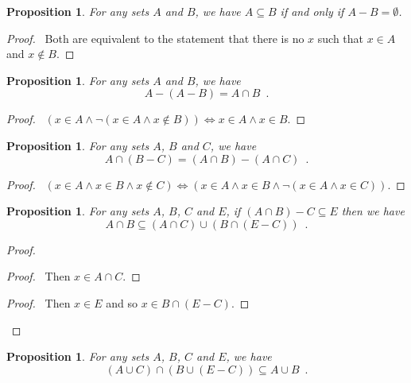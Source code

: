 \documentclass{report}
\let\qed\relax
\newtheorem{prop}[ax]{Proposition}
\theoremstyle{definition}
\begin{document}
\begin{prop}
For any sets $A$ and $B$, we have $A \subseteq B$ if and only if $A - B = \emptyset$.
\end{prop}

\begin{proof}
\pf\ Both are equivalent to the statement that there is no $x$ such that $x \in A$ and $x \notin B$. \qed
\end{proof}

\begin{prop}
For any sets $A$ and $B$, we have
\[ A - (A - B) = A \cap B \enspace . \]
\end{prop}

\begin{proof}
\pf\ $(x \in A \wedge \neg (x \in A \wedge x \notin B)) \Leftrightarrow x \in A \wedge x \in B$. \qed
\end{proof}

\begin{prop}
For any sets $A$, $B$ and $C$, we have
\[ A \cap (B - C) = (A \cap B) - (A \cap C) \enspace . \]
\end{prop}

\begin{proof}
\pf\ $(x \in A \wedge x \in B \wedge x \notin C) \Leftrightarrow (x \in A \wedge x \in B \wedge \neg (x \in A \wedge x \in C))$. \qed
\end{proof}

\begin{prop}
For any sets $A$, $B$, $C$ and $E$, if $(A \cap B) - C \subseteq E$ then we have
\[ A \cap B \subseteq (A \cap C) \cup (B \cap (E - C)) \enspace . \]
\end{prop}

\begin{proof}
\pf
{}
\begin{proof}
	\pf\ Then $x \in A \cap C$.
\end{proof}
\begin{proof}
	\pf\ Then $x \in E$ and so $x \in B \cap (E - C)$.
\end{proof}
\qed
\end{proof}

\begin{prop}
For any sets $A$, $B$, $C$ and $E$, we have
\[ (A \cup C) \cap (B \cup (E - C)) \subseteq A \cup B \enspace . \]
\end{prop}
\end{document}
